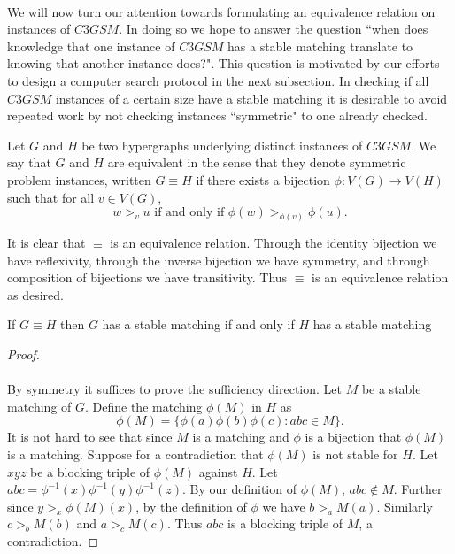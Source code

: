 \paragraph{}
We will now turn our attention towards formulating an equivalence relation on instances of $C3GSM$. In doing so we hope to answer the question ``when does knowledge that one instance of $C3GSM$ has a stable matching translate to knowing that another instance does?". This question is motivated by our efforts to design a computer search protocol in the next subsection. In checking if all $C3GSM$ instances of a certain size have a stable matching it is desirable to avoid repeated work by not checking instances ``symmetric" to one already checked.
\begin{definition}
Let $G$ and $H$ be two hypergraphs underlying distinct instances of $C3GSM$. We say that $G$ and $H$ are equivalent in the sense that they denote symmetric problem instances, written $G \equiv H$ if there exists a bijection $\phi: V(G) \rightarrow V(H)$ such that for all $v \in V(G)$,
 \begin{equation}\label{cond:order}
 w >_v u \text{ if and only if } \phi(w) >_{\phi(v)} \phi(u).
 \end{equation}
 \end{definition}
\begin{note}
It is clear that $\equiv$ is an equivalence relation. Through the identity bijection we have reflexivity, through the inverse bijection we have symmetry, and through composition of bijections we have transitivity. Thus $\equiv$ is an equivalence relation as desired.
\end{note}
 \begin{lemma}
 If $G \equiv H$ then $G$ has a stable matching if and only if $H$ has a stable matching
 \end{lemma}
 \begin{proof}
 \paragraph{}
 By symmetry it suffices to prove the sufficiency direction. Let $M$ be a stable matching of $G$. Define the matching $\phi(M)$ in $H$ as
 $$\phi(M) = \{ \phi(a)\phi(b)\phi(c): abc \in M \}.$$
 It is not hard to see that since $M$ is a matching and $\phi$ is a bijection that $\phi(M)$ is a matching. Suppose for a contradiction that $\phi(M)$ is not stable for $H$. Let $xyz$ be a blocking triple of $\phi(M)$ against $H$. Let $abc = \phi^{-1}(x)\phi^{-1}(y)\phi^{-1}(z)$. By our definition of $\phi(M)$, $abc \not\in M$. Further since $y >_x \phi(M)(x)$, by the definition of $\phi$ we have $b >_a M(a)$. Similarly $c>_b M(b)$ and $a>_c M(c)$. Thus $abc$ is a blocking triple of $M$, a contradiction.
 \end{proof}
